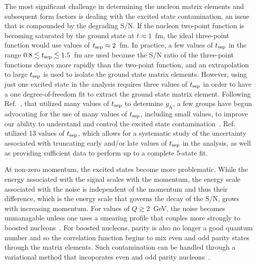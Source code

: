 The most significant challenge in determining the nucleon matrix elements and subsequent form factors is dealing with the excited state contamination, an issue that is compounded by the degrading S/N.
If the nucleon two-point function is becoming saturated by the ground state at $t\approx1$~fm, the ideal three-point function would use values of $t_{\rm sep}\approx2$~fm.
In practice, a few values of $t_{\rm sep}$ in the range $0.8 \lesssim t_{\rm sep} \lesssim 1.5$~fm are used because the S/N ratio of the three-point functions decays more rapidly than the two-point function, and an extrapolation to large $t_{\rm sep}$ is used to isolate the ground state matrix elements.
However, using just one excited state in the analysis requires three values of $t_{\rm sep}$ in order to have a one degree-of-freedom fit to extract the ground state matrix element.
Following Ref.~\cite{Chang:2018uxx}, that utilized many values of $t_{\rm sep}$ to determine $g_{\mathrm{A}}$, a few groups have begun advocating for the use of many values of $t_{\rm sep}$, including small values, to improve our ability to understand and control the excited state contamination~\cite{Hasan:2019noy,Alexandrou:2019brg,He:2021yvm}.
Ref.~\cite{He:2021yvm} utilized 13 values of $t_{\rm sep}$, which allows for a systematic study of the uncertainty associated with truncating early and/or late values of $t_{\rm sep}$ in the analysis, as well as providing sufficient data to perform up to a complete 5-state fit.

At non-zero momentum, the excited states become more problematic.  While the energy associated with the signal scales with the momentum, the energy scale associated with the noise is independent of the momentum and thus their difference, which is the energy scale that governs the decay of the S/N, grows with increasing momentum.
For values of $Q\gtrsim 2$~GeV, the noise becomes unmanagable unless one uses a smearing profile that couples more strongly to boosted nucleons~\cite{Bali:2016lva}.
For boosted nucleons, parity is also no longer a good quantum number and so the correlation function begins to mix even and odd parity states through the matrix elements.  Such contamination can be handled through a variational method that incoporates even and odd parity nucleons~\cite{Stokes:2013fgw,Stokes:2018emx,Stokes:2019zdd}.



